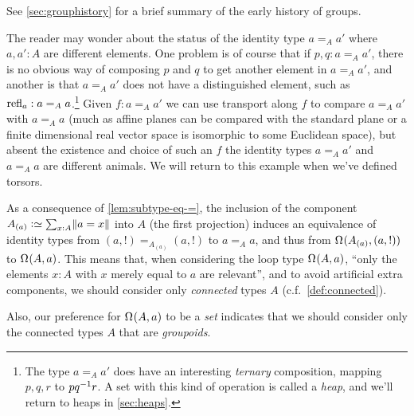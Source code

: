 See \cref{sec:grouphistory} for a brief summary of the early history of groups.
\begin{remark}
  The reader may wonder about the status of the identity type $a=_Aa'$ where $a,a':A$ are different elements.
  One problem is of course that if $p,q:a=_Aa'$,
  there is no obvious way of composing $p$ and $q$
  to get another element in $a=_A a'$,
  and another is that $a=_Aa'$ does not have a distinguished element,
  such as $\refl{a}:a=_Aa$.\footnote{%
    The type $a=_A a'$ does have an interesting \emph{ternary}
    composition, mapping $p,q,r$ to $pq^{-1}r$.
    A set with this kind of operation is called a \emph{heap},
    and we'll return to heaps in \cref{sec:heaps}.}
Given $f:a=_Aa'$ we can use transport along $f$ to compare $a=_Aa'$ with $a=_Aa$ (much as affine planes can be compared with the standard plane or a finite dimensional real vector space is isomorphic to some Euclidean space), but absent the existence and choice of such an $f$ the identity types $a=_Aa'$ and $a=_Aa$ are different animals.  
We will return to this example when we've defined torsors.
\end{remark}


\begin{remark}
  \label{rem:whypointedconngpoid}
  As a consequence of \cref{lem:subtype-eq-=},
  the inclusion of the component $\conncomp A a \defequi \sum_{x:A}\Trunc{a=x}$ into $A$
  (\ie the first projection)
  induces an equivalence of identity types
  from $(a,!)=_{A_{(a)}}(a,!)$ to $a=_Aa$,
  and thus from $\loops(A_{(a)},(a,!))$ to $\loops(A,a)$.
  This means that, when considering the loop type $\loops(A,a)$,
  ``only the elements $x:A$ with $x$ merely equal to $a$ are relevant'',
  and to avoid artificial extra components,
  we should consider only \emph{connected} types $A$ (c.f.~\cref{def:connected}).

  Also, our preference for $\loops(A,a)$ to be a \emph{set}
  indicates that we should consider only the connected types $A$
  that are \emph{groupoids}.
\end{remark}

